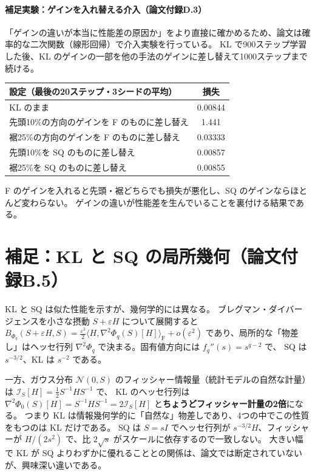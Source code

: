 \documentclass[a4paper,11pt]{ltjsarticle}
\theoremstyle{definition}
\theoremstyle{plain}
\newcommand{\ip}[2]{\langle #1,#2\rangle}
\newcommand{\Fro}{\mathrm{F}}
\begin{document}
\paragraph{補足実験：ゲインを入れ替える介入（論文付録D.3）}
「ゲインの違いが本当に性能差の原因か」をより直接に確かめるため、論文は確率的な二次関数（線形回帰）で介入実験を行っている。
KL で900ステップ学習した後、KL のゲインの一部を他の手法のゲインに差し替えて1000ステップまで続ける。
\begin{center}
\begin{tabular}{lc}
\toprule
設定（最後の20ステップ・3シードの平均） & 損失\\\midrule
KL のまま & 0.00844\\
先頭10\%の方向のゲインを F のものに差し替え & 1.441\\
裾25\%の方向のゲインを F のものに差し替え & 0.03333\\
先頭10\%を SQ のものに差し替え & 0.00857\\
裾25\%を SQ のものに差し替え & 0.00855\\
\bottomrule
\end{tabular}
\end{center}
F のゲインを入れると先頭・裾どちらでも損失が悪化し、SQ のゲインならほとんど変わらない。
ゲインの違いが性能差を生んでいることを裏付ける結果である。

\section{補足：KL と SQ の局所幾何（論文付録B.5）}

KL と SQ は似た性能を示すが、幾何学的には異なる。
ブレグマン・ダイバージェンスを小さな摂動 $S + \varepsilon H$ について展開すると
$B_{\Phi_q}(S + \varepsilon H, S) = \frac{\varepsilon^2}{2}\ip{H}{\nabla^2\Phi_q(S)[H]}_\Fro + o(\varepsilon^2)$
であり、局所的な「物差し」はヘッセ行列 $\nabla^2\Phi_q$ で決まる。固有値方向には $f_q''(s) = s^{q-2}$ で、
SQ は $s^{-3/2}$、KL は $s^{-2}$ である。

一方、ガウス分布 $\mathcal N(0,S)$ のフィッシャー情報量（統計モデルの自然な計量）は $\mathcal I_S[H] = \frac12S^{-1}HS^{-1}$ で、
KL のヘッセ行列は $\nabla^2\Phi_0(S)[H] = S^{-1}HS^{-1} = 2\mathcal I_S[H]$ と\textbf{ちょうどフィッシャー計量の2倍}になる。
つまり KL は情報幾何学的に「自然な」物差しであり、4つの中でこの性質をもつのは KL だけである。
SQ は $S = sI$ でヘッセ行列が $s^{-3/2}H$、フィッシャーが $H/(2s^2)$ で、比 $2\sqrt s$ がスケールに依存するので一致しない。
大きい幅で KL が SQ よりわずかに優れることとの関係は、論文では断定されていないが、興味深い違いである。
\end{document}
